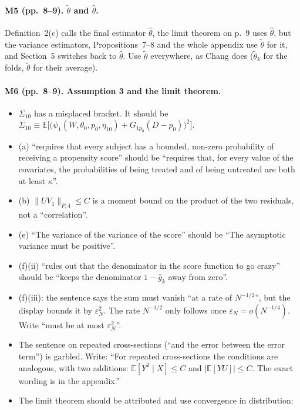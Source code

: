 \documentclass[11pt]{article}
\providecommand{\E}{\mathbb{E}}
\theoremstyle{plain}
\theoremstyle{remark}
\begin{document}
\paragraph{M5 (pp.~8--9). $\tilde\theta$ and $\hat\theta$.}
Definition~2(c) calls the final estimator $\hat\theta$, the limit theorem on
p.~9 uses $\hat\theta$, but the variance estimators, Propositions~7--8 and the
whole appendix use $\tilde\theta$ for it, and Section~5 switches back to
$\hat\theta$. Use $\tilde\theta$ everywhere, as Chang does ($\tilde\theta_k$ for
the folds, $\tilde\theta$ for their average).

\paragraph{M6 (pp.~8--9). Assumption 3 and the limit theorem.}
\begin{itemize}
\item $\Sigma_{10}$ has a misplaced bracket. It should be
  $\Sigma_{10}\equiv\E\big[\big(\psi_1(W,\theta_0,p_0,\eta_{10})+G_{1p_0}(D-p_0)\big)^2\big]$.
\item (a) ``requires that every subject has a bounded, non-zero probability of
  receiving a propensity score'' should be ``requires that, for every value of
  the covariates, the probabilities of being treated and of being untreated are
  both at least $\kappa$''.
\item (b) $\|UV_1\|_{P,4}\le C$ is a moment bound on the product of the two
  residuals, not a ``correlation''.
\item (e) ``The variance of the variance of the score'' should be ``The asymptotic
  variance must be positive''.
\item (f)(ii) ``rules out that the denominator in the score function to go
  crazy'' should be ``keeps the denominator $1-\hat g_k$ away from zero''.
\item (f)(iii): the sentence says the sum must vanish ``at a rate of
  $N^{-1/2}$'', but the display bounds it by $\varepsilon_N^2$. The rate
  $N^{-1/2}$ only follows once $\varepsilon_N=o(N^{-1/4})$. Write ``must be at
  most $\varepsilon_N^2$''.
\item The sentence on repeated cross-sections (``and the error between the
  error term'') is garbled. Write: ``For repeated cross-sections the conditions
  are analogous, with two additions: $\E[Y^2\mid X]\le C$ and $|\E[YU]|\le C$.
  The exact wording is in the appendix.''
\item The limit theorem should be attributed and use convergence in
  distribution:
\end{itemize}
\end{document}

